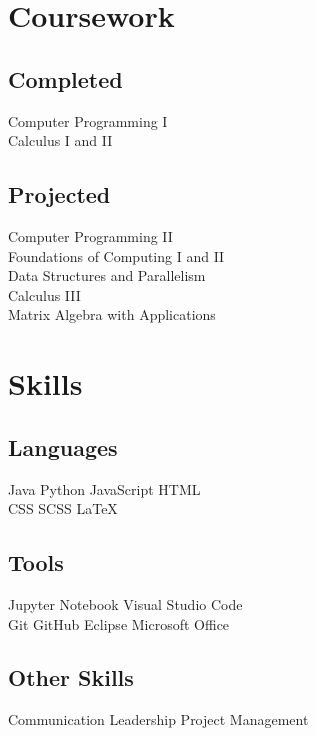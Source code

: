 \documentclass[]{deedy-resume}
\begin{document}
\begin{minipage}[t]{0.33\textwidth}

\section{Coursework}

\subsection{Completed}
Computer Programming I \\
Calculus I and II \\
\sectionsep

\subsection{Projected}
Computer Programming II \\
Foundations of Computing I and II \\
Data Structures and Parallelism \\
Calculus III \\
Matrix Algebra with Applications \\


\section{Skills}

\subsection{Languages}
Java \textbullet{} Python \textbullet{} JavaScript \textbullet{} HTML \\
CSS \textbullet{} SCSS \textbullet{} LaTeX
\sectionsep

\subsection{Tools}
Jupyter Notebook \textbullet{} Visual Studio Code \\
Git \textbullet{} GitHub \textbullet{} Eclipse \textbullet{} Microsoft Office
\sectionsep

\subsection{Other Skills}
Communication \textbullet{} Leadership \textbullet{} Project Management
\sectionsep


\end{minipage}
\end{document}
